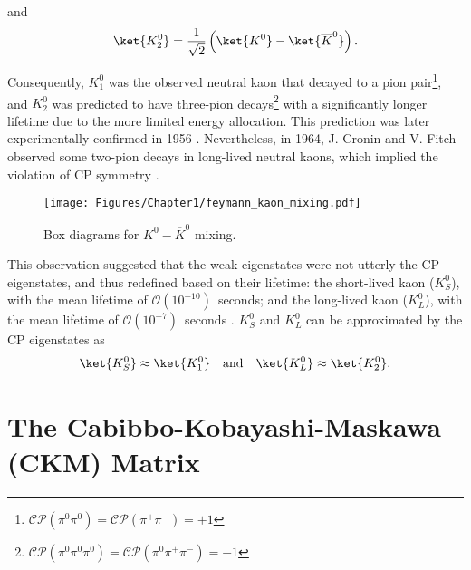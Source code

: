 \noindent
and
%
\begin{align}
\ket{K_2^0} = \frac{1}{\sqrt{2}} \left( \ket{K^0} - \ket{\overline{K}^0}\right) .
\end{align}

\noindent
Consequently, $K_1^0$ was the observed neutral kaon that decayed to a pion pair\footnote{
$\mathcal{CP}(\pi^0\pi^0)=\mathcal{CP}(\pi^+\pi^-)=+1$
}, and $K_2^0$ was predicted to have three-pion decays\footnote{
$\mathcal{CP}(\pi^0\pi^0\pi^0)=\mathcal{CP}(\pi^0\pi^+\pi^-)=-1$
} with a significantly longer lifetime due to the more limited energy allocation. This prediction was later experimentally confirmed in 1956 \parencite{KL_observation}. Nevertheless, in 1964, J. Cronin and V. Fitch observed some two-pion decays in long-lived neutral kaons, which implied the violation of CP symmetry \parencite{K_CPviolation_exp}.

\begin{figure}[h]
\begin{center}
\captionsetup{width=.95\linewidth}
\texttt{[image: Figures/Chapter1/feymann\_kaon\_mixing.pdf]}
\caption{Box diagrams for $K^0-\overline{K}^0$ mixing.}
\label{fig:kaon_mixing}
\end{center}
\end{figure}

This observation suggested that the weak eigenstates were not utterly the CP eigenstates, and thus redefined based on their lifetime: the short-lived kaon ($K_S^0$), with the mean lifetime of $\mathcal{O}(10^{-10})$~seconds; and the long-lived kaon ($K_L^0$), with the mean lifetime of $\mathcal{O}(10^{-7})$~seconds \parencite{PDG20}. $K_S^0$ and $K_L^0$ can be approximated by the CP eigenstates as
%
\vspace{1em}
\begin{align}
\ket{K_S^0} \approx \ket{K_1^0} \quad {\text{and}} \quad \ket{K_L^0} \approx \ket{K_2^0}.
\end{align}


%
%

\section{The Cabibbo-Kobayashi-Maskawa (CKM) Matrix}

